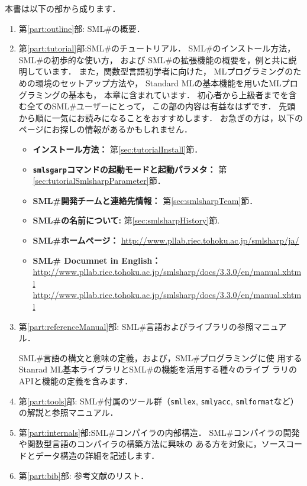 \documentclass{jbook}
\newcommand{\smlsharp}{SML\#}
\newcommand{\version}{3.3.0}
\newcommand{\documentUrlEn}{\url{http://www.pllab.riec.tohoku.ac.jp/smlsharp/docs/3.3.0/en/manual.xhtml}}
\begin{document}
\ifjp%
	本書は以下の部から成ります．
\begin{enumerate}
\item
	第\ref{part:outline}部: \smlsharp{}の概要．
\item
	第\ref{part:tutorial}部:\smlsharp{}のチュートリアル．
	\smlsharp{}のインストール方法，
\smlsharp{}の初歩的な使い方，
および
\smlsharp{}の拡張機能の概要を，例と共に説明しています．
	また，関数型言語初学者に向けた，
MLプログラミングのための環境のセットアップ方法や，
Standard MLの基本機能を用いたMLプログラミングの基本も，
本章に含まれています．
	初心者から上級者までを含む全ての\smlsharp{}ユーザーにとって，
この部の内容は有益なはずです．
	先頭から順に一気にお読みになることをおすすめします．
	お急ぎの方は，以下のページにお探しの情報があるかもしれません．
\begin{itemize}
\item {\bf インストール方法：}
第\ref{sec:tutorialInstall}節．
\item {\bf {\tt smlsgarp}コマンドの起動モードと起動パラメタ：}
第\ref{sec:tutorialSmlsharpParameter}節．
\item {\bf \smlsharp{}開発チームと連絡先情報：} 
第\ref{sec:smlsharpTeam}節．
\item {\bf \smlsharp{}の名前について:}
第\ref{sec:smlsharpHistory}節.
\item {\bf \smlsharp{}ホームページ：}
\url{http://www.pllab.riec.tohoku.ac.jp/smlsharp/ja/}
\item {\bf \smlsharp{} Documnet in English：}
\url{http://www.pllab.riec.tohoku.ac.jp/smlsharp/docs/\version/en/manual.xhtml}
\documentUrlEn
\end{itemize}   

\item
	第\ref{part:referenceManual}部:
\smlsharp{}言語およびライブラリの参照マニュアル．

\smlsharp{}言語の構文と意味の定義，および，\smlsharp{}プログラミングに使
用するStanrad ML基本ライブラリと\smlsharp{}の機能を活用する種々のライブ
ラリのAPIと機能の定義を含みます．

\item
	第\ref{part:tools}部:
\smlsharp{}付属のツール群（{\tt smllex}, {\tt smlyacc}, {\tt smlformat}など）
の解説と参照マニュアル．

\item
	第\ref{part:internals}部:\smlsharp{}コンパイラの内部構造．
\smlsharp{}コンパイラの開発や関数型言語のコンパイラの構築方法に興味の
ある方を対象に，ソースコードとデータ構造の詳細を記述します．

\item
	第\ref{part:bib}部: 参考文献のリスト．
\end{enumerate}
\end{document}
